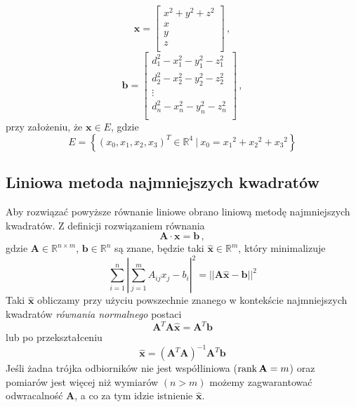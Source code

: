 \begin{equation}
    \mathbf{x} =
    \left[
        \begin{matrix}
            x^2 + y^2 + z^2\\
            x\\
            y\\
            z\\
        \end{matrix}
    \right]\,,
\end{equation}
\begin{equation}
    \mathbf{b} =
    \left[
        \begin{matrix}
            d_1^2 - x_1^2 - y_1^2 - z_1^2\\
            d_2^2 - x_2^2 - y_2^2 - z_2^2\\
            \vdots\\
            d_n^2 - x_n^2 - y_n^2 - z_n^2\\
        \end{matrix}
    \right]\,,
\end{equation}
\noindent
przy założeniu, że $\mathbf{x} \in E$, gdzie
\begin{equation}
    E = \left\{(x_0, x_1, x_2, x_3)^T \in {\mathbb{R}}^4\ |\ x_0 = {x_1}^2 + {x_2}^2 + {x_3}^2\right\}
    \label{eq:constraint}
\end{equation}

\subsection{Liniowa metoda najmniejszych kwadratów}

Aby rozwiązać powyższe równanie liniowe obrano liniową metodę najmniejszych kwadratów. Z definicji rozwiązaniem równania
\begin{equation}
    \mathbf{A} \cdot \mathbf{x} = \mathbf{b}\,,
\end{equation}
gdzie $\mathbf{A} \in \mathbb{R}^{n\times m}$, $\mathbf{b} \in \mathbb{R}^n$ są znane, będzie taki $\hat{\mathbf{x}} \in \mathbb{R}^m$, który minimalizuje
\begin{equation}
    \sum_{i=1}^{n}{\left|\sum_{j=1}^{m}{A_{ij}x_j} - b_i\right|^2} = ||\mathbf{A}\hat{\mathbf{x}} - \mathbf{b}||^2
\end{equation}
Taki $\hat{\mathbf{x}}$ obliczamy przy użyciu powszechnie znanego w kontekście najmniejszych kwadratów \textit{równania normalnego} postaci
\begin{equation}
    \mathbf{A}^T\mathbf{A}\hat{\mathbf{x}} = \mathbf{A}^T\mathbf{b}
\end{equation}
lub po przekształceniu
\begin{equation}\label{eq:lls}
    \hat{\mathbf{x}} = {\left(\mathbf{A}^T\mathbf{A}\right)}^{-1}\mathbf{A}^T\mathbf{b}
\end{equation}
Jeśli żadna trójka odbiorników nie jest współliniowa ($\operatorname{rank}\mathbf{A} = m$) oraz pomiarów jest więcej niż wymiarów $(n > m)$ możemy zagwarantować odwracalność $\mathbf{A}$, a co za tym idzie istnienie $\hat{\mathbf{x}}$.

